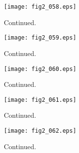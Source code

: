 \documentclass[preprint]{aastex}
\begin{document}
\setcounter{figure}{1}
\begin{figure}[t]
\centering
\texttt{[image: fig2\_058.eps]}
\caption{
Continued. 
}
\label{Fig2}
\end{figure}
\clearpage



\setcounter{figure}{1}
\begin{figure}[t]
\centering
\texttt{[image: fig2\_059.eps]}
\caption{
Continued. 
}
\label{Fig2}
\end{figure}
\clearpage



\setcounter{figure}{1}
\begin{figure}[t]
\centering
\texttt{[image: fig2\_060.eps]}
\caption{
Continued. 
}
\label{Fig2}
\end{figure}
\clearpage



\setcounter{figure}{1}
\begin{figure}[t]
\centering
\texttt{[image: fig2\_061.eps]}
\caption{
Continued. 
}
\label{Fig2}
\end{figure}
\clearpage



\setcounter{figure}{1}
\begin{figure}[t]
\centering
\texttt{[image: fig2\_062.eps]}
\caption{
Continued. 
}
\label{Fig2}
\end{figure}
\clearpage
\end{document}
